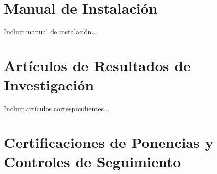 \documentclass[12pt,openright,oneside]{book}
\begin{document}
\section{Manual de Instalación}
Incluir manual de instalación...

\section{Artículos de Resultados de Investigación}
Incluir artículos correspondientes...

\section{Certificaciones de Ponencias y Controles de Seguimiento}


\end{document}
